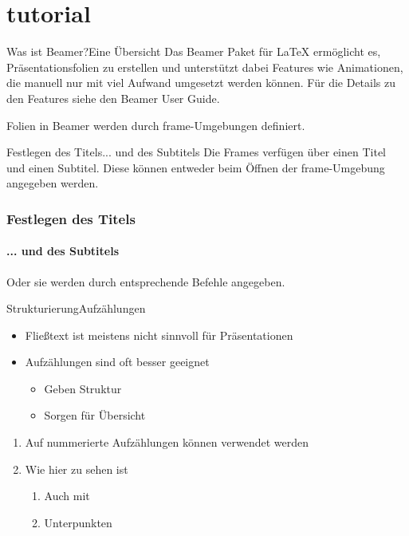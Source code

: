 \documentclass[t,aspectratio=169,dvipsnames]{beamer}
\begin{document}
\section{tutorial}
\begin{frame}{Was ist Beamer?}{Eine Übersicht}
Das Beamer Paket für \LaTeX{} ermöglicht es, Präsentationsfolien zu erstellen und unterstützt dabei Features wie Animationen, die manuell nur mit viel Aufwand umgesetzt werden können.
Für die Details zu den Features siehe den Beamer User Guide\cite{BeamerDoc}.
\end{frame}

\begin{frame}
Folien in Beamer werden durch frame-Umgebungen definiert.
\end{frame}

\begin{frame}{Festlegen des Titels}{... und des Subtitels}
Die Frames verfügen über einen Titel und einen Subtitel.
Diese können entweder beim Öffnen der frame-Umgebung angegeben werden.
\end{frame}

\begin{frame}
	\frametitle{Festlegen des Titels}
	\framesubtitle{... und des Subtitels}
	Oder sie werden durch entsprechende Befehle angegeben.
\end{frame}

\begin{frame}{Strukturierung}{Aufzählungen}
\begin{itemize}
	\item Fließtext ist meistens nicht sinnvoll für Präsentationen
	\item Aufzählungen sind oft besser geeignet
	\begin{itemize}
		\item Geben Struktur
		\item Sorgen für Übersicht
	\end{itemize}
\end{itemize}
\begin{enumerate}
	\item Auf nummerierte Aufzählungen können verwendet werden
	\item Wie hier zu sehen ist
	\begin{enumerate}
		\item Auch mit
		\item Unterpunkten
	\end{enumerate} 
\end{enumerate}
\end{frame}
\end{document}
